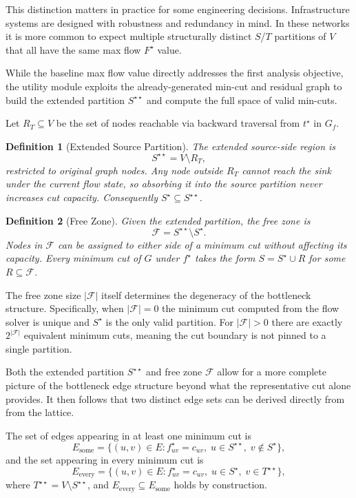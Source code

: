 \documentclass[12pt]{report}
\newtheorem{definition}{Definition}
\begin{document}
This distinction matters in practice for some engineering decisions. Infrastructure systems are designed with robustness and redundancy in mind. In these networks it is more common to expect multiple structurally distinct $S$/$T$ partitions of $V$ that all have the same max flow $F^\star$ value.

While the baseline max flow value directly addresses the first analysis objective, the utility module exploits the already-generated min-cut and residual graph to build the extended partition $S^{\star\star}$ and compute the full space of valid min-cuts. 

Let $R_T \subseteq V$ be the set of nodes reachable via backward traversal from 
$t^\star$ in $G_f$.

\begin{definition}[Extended Source Partition]
The extended source-side region is
\[
S^{\star\star} = V \setminus R_T,
\]
restricted to original graph nodes. Any node outside $R_T$ cannot reach the sink 
under the current flow state, so absorbing it into the source partition never 
increases cut capacity. Consequently $S^\star \subseteq S^{\star\star}$.
\end{definition}

\begin{definition}[Free Zone]
Given the extended partition, the free zone is
\[
\mathcal{F} = S^{\star\star} \setminus S^\star.
\]
Nodes in $\mathcal{F}$ can be assigned to either side of a minimum cut without 
affecting its capacity. Every minimum cut of $G$ under $f^\star$ takes the form 
$S = S^\star \cup R$ for some $R \subseteq \mathcal{F}$.
\end{definition}

The free zone size $|\mathcal{F}|$ itself determines the degeneracy of the bottleneck structure. Specifically, when $|\mathcal{F}| = 0$ the minimum cut computed from the flow solver is unique and $S^\star$ is the only valid partition. For $|\mathcal{F}| > 0$ there are exactly 
$2^{|\mathcal{F}|}$ equivalent minimum cuts, meaning the cut boundary is not pinned 
to a single partition. 

Both the extended partition $S^{\star\star}$ and free zone $\mathcal{F}$ allow for a more complete picture of the bottleneck edge structure beyond what the representative cut alone provides. It then follows that two distinct edge sets can be derived directly from from the lattice.

 The set of edges appearing in at least one minimum cut is \[ E_{\text{some}} = \{(u,v)\in E : f^\star_{uv} = c_{uv},\; u \in S^{\star\star},\; v \notin S^\star\}, \] and the set appearing in every minimum cut is \[ E_{\text{every}} = \{(u,v)\in E : f^\star_{uv} = c_{uv},\; u \in S^\star,\; v \in T^{\star\star}\}, \] where $T^{\star\star} = V \setminus S^{\star\star}$, and $E_{\text{every}} \subseteq E_{\text{some}}$ holds by construction. 
\end{document}
